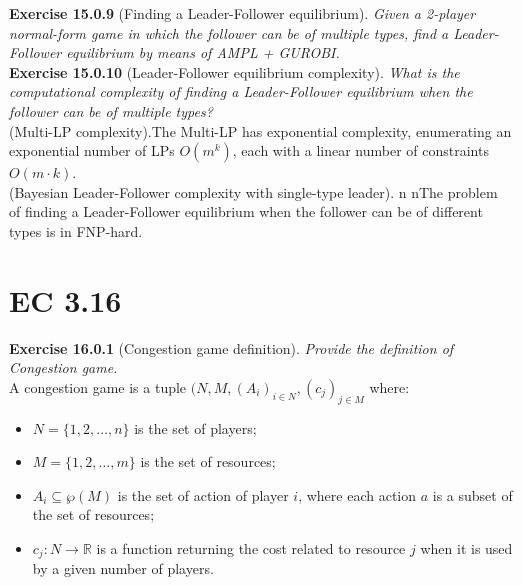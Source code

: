 \textbf{Exercise 15.0.9} (Finding a Leader-Follower equilibrium). \textit{Given a 2-player normal-form game in which the follower can be of multiple types, find a Leader-Follower equilibrium by means of AMPL + GUROBI.}\\

\textbf{Exercise 15.0.10} (Leader-Follower equilibrium complexity). \textit{What is the computational complexity of finding a Leader-Follower equilibrium when the follower can be of multiple types?}\\

(Multi-LP complexity).The Multi-LP has exponential complexity, enumerating an exponential number of LPs $O(m^k)$, each with a linear number of constraints $O(m \cdot k)$.\\
(Bayesian Leader-Follower complexity with single-type leader). n nThe problem of finding a Leader-Follower equilibrium when the follower can be of different types is in \textsf{FNP}-hard.

\section{EC 3.16}

\textbf{Exercise 16.0.1} (Congestion game definition). \textit{Provide the definition of Congestion game.}\\

A congestion game is a tuple $(N,M, (A_i)_{i \in N}, (c_j)_{j \in M}$ where:
\begin{itemize}
\item $N= \{1,2,\ldots,n\}$ is the set of players;
\item $M= \{1,2,\ldots,m\}$ is the set of resources;
\item $A_i \subseteq \wp (M)$ is the set of action of player $i$, where each action $a$ is a subset of the set of resources;
\item $c_j: N \rightarrow \mathbb{R}$ is a function returning the cost related to resource $j$ when it is used by a given number of players.
\end{itemize}

